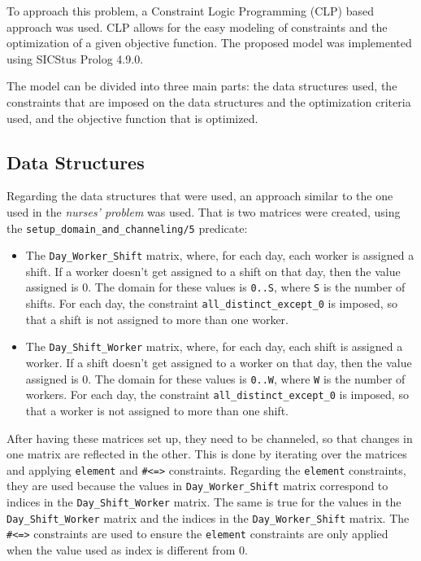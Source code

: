 \documentclass[conference]{IEEEtran}
\begin{document}
To approach this problem, a Constraint Logic Programming (CLP) based approach was used. CLP allows for the easy modeling of constraints and the optimization of a given objective function.
The proposed model was implemented using SICStus Prolog 4.9.0. 

The model can be divided into three main parts: the data structures used, the constraints that are imposed on the data structures and the optimization criteria used, and the objective function that is optimized.

\subsection{Data Structures}
\label{section:data-structures}

Regarding the data structures that were used, an approach similar to the one used in the \textit{nurses' problem} was used. That is two matrices were created, using the \texttt{setup\_domain\_and\_channeling/5} predicate:

\begin{itemize}
    \item {
        The \texttt{Day\_Worker\_Shift} matrix, where, for each day, each worker is assigned a shift. If a worker doesn't get assigned to a shift on that day, then the value assigned is 0.
        The domain for these values is \texttt{0..S}, where \texttt{S} is the number of shifts. For each day, the constraint \texttt{all\_distinct\_except\_0} is imposed, so that a shift is not assigned to more than one worker.
    }
    \item {
        The \texttt{Day\_Shift\_Worker} matrix, where, for each day, each shift is assigned a worker. If a shift doesn't get assigned to a worker on that day, then the value assigned is 0.
        The domain for these values is \texttt{0..W}, where \texttt{W} is the number of workers. For each day, the constraint \texttt{all\_distinct\_except\_0} is imposed, so that a worker is not assigned to more than one shift.
    }
\end{itemize}

After having these matrices set up, they need to be channeled, so that changes in one matrix are reflected in the other.
This is done by iterating over the matrices and applying \texttt{element} and \texttt{\#<=>} constraints. Regarding the \texttt{element} constraints, they are used because the values in \texttt{Day\_Worker\_Shift} matrix correspond to indices in the \texttt{Day\_Shift\_Worker} matrix. The same is true for the values in the \texttt{Day\_Shift\_Worker} matrix and the indices in the \texttt{Day\_Worker\_Shift} matrix. The \texttt{\#<=>} constraints are used to ensure the \texttt{element} constraints are only applied when the value used as index is different from 0.
\end{document}
